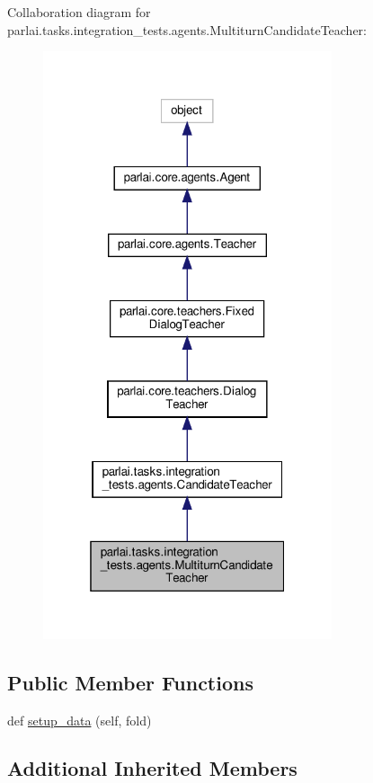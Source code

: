 Collaboration diagram for parlai.\+tasks.\+integration\+\_\+tests.\+agents.\+Multiturn\+Candidate\+Teacher\+:
\nopagebreak
\begin{figure}[H]
\begin{center}
\leavevmode
\includegraphics[width=241pt]{classparlai_1_1tasks_1_1integration__tests_1_1agents_1_1MultiturnCandidateTeacher__coll__graph}
\end{center}
\end{figure}
\subsection*{Public Member Functions}
\begin{DoxyCompactItemize}
\item 
def \hyperlink{classparlai_1_1tasks_1_1integration__tests_1_1agents_1_1MultiturnCandidateTeacher_aed2bfff52c3db13cb2a0d2acf41fdb8f}{setup\+\_\+data} (self, fold)
\end{DoxyCompactItemize}
\subsection*{Additional Inherited Members}


